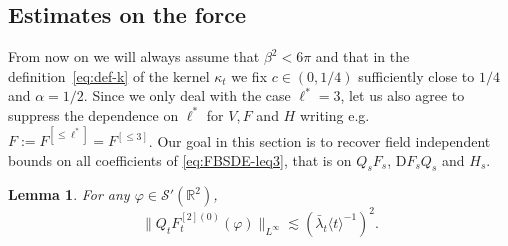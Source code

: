 \documentclass[11pt, a4paper]{scrartcl}
\numberwithin{equation}{section}
\theoremstyle{plain}
\newtheorem{lemma}[foo]{Lemma}
\theoremstyle{remark}
\newcommand{\assign}{:=}
\newcommand{\mathD}{\mathrm{D}}
\begin{document}
\subsection{Estimates on the force}\label{sec:F-estimates}

From now on we will always assume that $\beta^2 < 6 \pi$ and that in the
definition~\eqref{eq:def-k} of the kernel $\kappa_t$ we fix $c \in (0, 1 / 4)$
sufficiently close to $1 / 4$ and $\alpha = 1 / 2$. Since we only deal with
the case $\ell^{\ast} = 3$, let us also agree to suppress the dependence on
$\ell^{\ast}$ for $V, F$ and $H$ writing e.g. \ $F \assign F^{[\leqslant
\ell^{\ast}]} = F^{[\leqslant 3]}$. Our goal in this section is to recover
field independent bounds on all coefficients of \eqref{eq:FBSDE-leq3}, that is
on $Q_s F_s$, $\mathD F_s Q_s$ and $H_s$.

\begin{lemma}
  \label{lem:F2-uniform-bounds}For any $\varphi \in \mathcal{S}'
  (\mathbb{R}^2)$,
  \[ \| Q_t F_t^{[2] (0)} (\varphi) \|_{L^{\infty}} \lesssim (\bar{\lambda}_t
     \langle t \rangle^{- 1})^2 . \]
\end{lemma}
\end{document}
